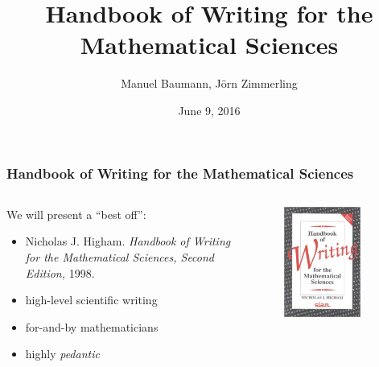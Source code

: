 \documentclass{beamer}
\title{\bf Handbook of Writing for the \\ Mathematical Sciences}
\author{Manuel Baumann, J\"orn Zimmerling}
\date{\footnotesize{June 9, 2016}}
\begin{document}
\frame{\titlepage}
\begin{frame}
\frametitle{Handbook of Writing for the Mathematical Sciences}
\begin{columns}
 \begin{column}{0.6\textwidth}
We will present a ``best off'':

 \begin{itemize}
  \item Nicholas J. Higham. \emph{Handbook of Writing for the Mathematical Sciences, Second Edition,} 1998.
  \item high-level scientific writing
  \item for-and-by mathematicians
  \item highly \textit{pedantic}
 \end{itemize}
 \end{column}

 \begin{column}{0.4\textwidth}
  \begin{figure}[t]
  \centering
  \includegraphics[width=0.8\textwidth]{images/book_cover.jpg}
  \end{figure}
 \end{column}
 \end{columns}
 
\end{frame}
\end{document}
